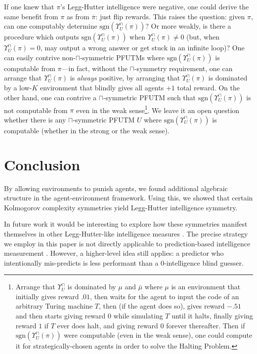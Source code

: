 \documentclass[runningheads]{llncs}
\def\LH{\Upsilon}
\def\sgn{\mathrm{sgn}}
\begin{document}
If one knew that $\pi$'s Legg-Hutter intelligence were negative, one could
derive the same benefit from $\pi$ as from $\overline{\pi}$: just flip
rewards. This raises the question: given $\pi$, can
one computably determine $\sgn(\LH^\sqcap_U(\pi))$? Or more weakly, is there
a procedure which outputs $\sgn(\LH^\sqcap_U(\pi))$ when
$\LH^\sqcap_U(\pi)\not=0$ (but, when $\LH^\sqcap_U(\pi)=0$, may output a wrong answer
or get stuck in an infinite loop)?
One can easily contrive non-$\sqcap$-symmetric PFUTMs where $\sgn(\LH^\sqcap_U(\pi))$
is computable from $\pi$---in fact, without the $\sqcap$-symmetry requirement,
one can arrange that $\LH^\sqcap_U(\pi)$ is
\emph{always} positive, by arranging that $\LH^\sqcap_U(\pi)$ is dominated by
a low-$K$ environment that blindly gives all agents $+1$ total reward.
On the other hand, one can contrive a $\sqcap$-symmetric PFUTM such that
$\sgn(\LH^\sqcap_U(\pi))$ is not computable from $\pi$ even in the weak sense\footnote{Arrange
that $\LH^\sqcap_U$ is dominated by $\mu$ and $\bar{\mu}$ where $\mu$ is an environment
that initially gives reward $.01$, then waits for the agent to input the code of
an arbitrary Turing machine $T$, then (if the agent does so), gives reward $-.51$ and then
starts giving reward $0$ while simulating $T$ until it halts, finally giving reward $1$
if $T$ ever does halt, and giving reward $0$ forever thereafter.
Then if $\sgn(\LH^\sqcap_U(\pi))$ were computable (even
in the weak sense), one could compute it for strategically-chosen agents in order
to solve the Halting Problem.}.
We leave it an open question whether there is any $\sqcap$-symmetric
PFUTM $U$ where $\sgn(\LH^\sqcap_U(\pi))$ is computable (whether in the strong
or the weak sense).


\section{Conclusion}
\label{conclusionsecn}

By allowing environments to punish agents,
we found additional algebraic structure in the agent-environment
framework. Using this, we showed
that certain Kolmogorov complexity symmetries yield
Legg-Hutter intelligence symmetry.

In future work it would be interesting to explore how these symmetries
manifest themselves in other Legg-Hutter-like intelligence measures
\cite{gavane} \cite{goertzel2006patterns} \cite{hernandez}.
The precise strategy we employ in this
paper is not directly applicable to prediction-based intelligence measurement
\cite{hibbard} \cite{alexander2021measuring}
\cite{gamez2021measuring}. However, a higher-level
idea still applies:
a predictor who intentionally mis-predicts
is less performant than a $0$-intelligence blind guesser.
\end{document}
